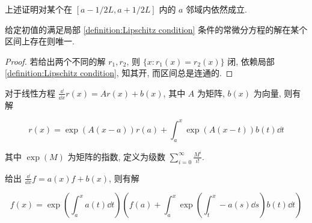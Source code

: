 \begin{remark}
    上述证明对某个在 \([a-1/2L,a+1/2L]\) 内的 \(a\) 邻域内依然成立.
\end{remark}

\begin{lemma}
    给定初值的满足局部 \ref{definition:Lipschitz condition} 条件的常微分方程的解在某个区间上存在则唯一.

    \begin{proof}
        若给出两个不同的解 \(r_1,r_2\), 则 \(\{x:r_1(x) = r_2(x)\}\) 闭, 依赖局部 \ref{definition:Lipschitz condition},
        知其开, 而区间总是连通的.
    \end{proof}
\end{lemma}

\begin{example}[常系数线性微分方程]
    对于线性方程 \(\frac{\dd}{\dd x} r(x) = A r(x) + b(x)\), 其中 \(A\) 为矩阵, \(b(x)\) 为向量, 则有解 
    
    \[
        r(x) = \exp (A(x-a)) r(a) + \int_{a}^{x} \exp (A(x-t)) b(t) \dd t
    \]

    其中 \(\exp (M)\) 为矩阵的指数, 定义为级数 \(\sum_{i=0}^{\infty} \frac{M^i}{i!}\).
\end{example}

\begin{example}[一次线性微分方程]
    给出 \(\frac{\dd}{\dd x} f = a(x) f + b(x)\), 则有解 
    
    \[
        f(x) = \exp (\int_{a}^{x} a(t) \dd t) (f(a) + \int_{a}^{x} \exp (\int_{t}^{x} -a(s) \dd s) b(t) \dd t)
    \]
\end{example}
